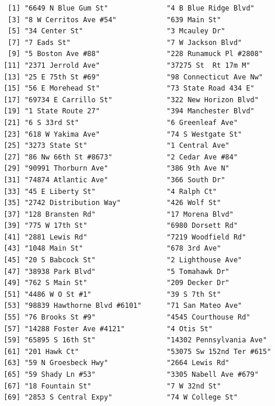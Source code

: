 \documentclass[
  12pt,
]{article}
\begin{document}
\begin{verbatim}
  [1] "6649 N Blue Gum St"              "4 B Blue Ridge Blvd"            
  [3] "8 W Cerritos Ave #54"            "639 Main St"                    
  [5] "34 Center St"                    "3 Mcauley Dr"                   
  [7] "7 Eads St"                       "7 W Jackson Blvd"               
  [9] "5 Boston Ave #88"                "228 Runamuck Pl #2808"          
 [11] "2371 Jerrold Ave"                "37275 St  Rt 17m M"             
 [13] "25 E 75th St #69"                "98 Connecticut Ave Nw"          
 [15] "56 E Morehead St"                "73 State Road 434 E"            
 [17] "69734 E Carrillo St"             "322 New Horizon Blvd"           
 [19] "1 State Route 27"                "394 Manchester Blvd"            
 [21] "6 S 33rd St"                     "6 Greenleaf Ave"                
 [23] "618 W Yakima Ave"                "74 S Westgate St"               
 [25] "3273 State St"                   "1 Central Ave"                  
 [27] "86 Nw 66th St #8673"             "2 Cedar Ave #84"                
 [29] "90991 Thorburn Ave"              "386 9th Ave N"                  
 [31] "74874 Atlantic Ave"              "366 South Dr"                   
 [33] "45 E Liberty St"                 "4 Ralph Ct"                     
 [35] "2742 Distribution Way"           "426 Wolf St"                    
 [37] "128 Bransten Rd"                 "17 Morena Blvd"                 
 [39] "775 W 17th St"                   "6980 Dorsett Rd"                
 [41] "2881 Lewis Rd"                   "7219 Woodfield Rd"              
 [43] "1048 Main St"                    "678 3rd Ave"                    
 [45] "20 S Babcock St"                 "2 Lighthouse Ave"               
 [47] "38938 Park Blvd"                 "5 Tomahawk Dr"                  
 [49] "762 S Main St"                   "209 Decker Dr"                  
 [51] "4486 W O St #1"                  "39 S 7th St"                    
 [53] "98839 Hawthorne Blvd #6101"      "71 San Mateo Ave"               
 [55] "76 Brooks St #9"                 "4545 Courthouse Rd"             
 [57] "14288 Foster Ave #4121"          "4 Otis St"                      
 [59] "65895 S 16th St"                 "14302 Pennsylvania Ave"         
 [61] "201 Hawk Ct"                     "53075 Sw 152nd Ter #615"        
 [63] "59 N Groesbeck Hwy"              "2664 Lewis Rd"                  
 [65] "59 Shady Ln #53"                 "3305 Nabell Ave #679"           
 [67] "18 Fountain St"                  "7 W 32nd St"                    
 [69] "2853 S Central Expy"             "74 W College St"                

\end{verbatim}
\end{document}
